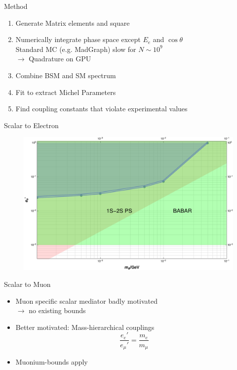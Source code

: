\documentclass[11pt]{beamer}
\numberwithin{equation}{section}
\begin{document}
\begin{frame}{Method}
\begin{enumerate}
\item Generate Matrix elements and square
\pause
\item Numerically integrate phase space except $E_e$ and $\cos\theta$\\
\pause
Standard MC (e.g. MadGraph) slow for $N \sim 10^9$\\
\pause
$\rightarrow$ Quadrature on GPU 
\pause
\item Combine BSM and SM spectrum
\pause
\item Fit to extract Michel Parameters
\pause
\item Find coupling constants that violate experimental values
\end{enumerate}
\end{frame}

\begin{frame}{Scalar to Electron}
\begin{figure}[!ht]
  \centering
    \includegraphics[width=\textwidth]{../imgs/MuBoundOnScalarElectron}
\end{figure}
\end{frame}

\begin{frame}{Scalar to Muon}
\begin{itemize}
\item Muon specific scalar mediator badly motivated\\
\pause
$\rightarrow$ no existing bounds
\item Better motivated: Mass-hierarchical couplings
\\
\begin{equation*}
\frac{e_e'}{e_\mu'}= \frac{m_e}{m_\mu}
\end{equation*}
\pause 
\item Muonium-bounds apply
\end{itemize}

\end{frame}
\end{document}
